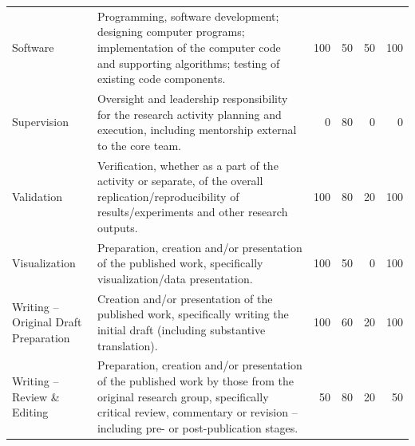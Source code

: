 \documentclass[a4paper,twoside=true,openright,parskip=full,chapterprefix=true,11pt,headings=normal,bibliography=totoc,listof=totoc,titlepage=on,captions=tableabove,draft=false]{scrreprt}
\theoremstyle{definition}
\theoremstyle{definition}
\theoremstyle{definition}
\theoremstyle{remark}
\begin{document}
\begin{table}
\begin{tabular}[t]{llrrrr}
Software & Programming, software development; designing computer programs; implementation of the computer code and supporting algorithms; testing of existing code components. & 100 & 50 & 50 & 100\\
Supervision & Oversight and leadership responsibility for the research activity planning and execution, including mentorship external to the core team. & 0 & 80 & 0 & 0\\
\addlinespace
Validation & Verification, whether as a part of the activity or separate, of the overall replication/reproducibility of results/experiments and other research outputs. & 100 & 80 & 20 & 100\\
Visualization & Preparation, creation and/or presentation of the published work, specifically visualization/data presentation. & 100 & 50 & 0 & 100\\
Writing – Original Draft Preparation & Creation and/or presentation of the published work, specifically writing the initial draft (including substantive translation). & 100 & 60 & 20 & 100\\
Writing – Review \& Editing & Preparation, creation and/or presentation of the published work by those from the original research group, specifically critical review, commentary or revision – including pre- or post-publication stages. & 50 & 80 & 20 & 50\\
\bottomrule
\end{tabular}
\end{table}





% 
\end{document}
